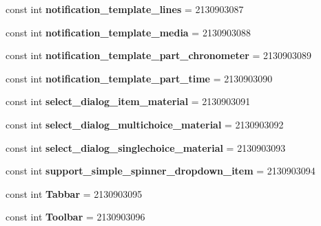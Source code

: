 \begin{DoxyCompactItemize}
\mbox{\label{class_pinned_app_1_1_droid_1_1_resource_1_1_layout_a040671cccbbccdfeee80094184351834}} 
const int {\bfseries notification\+\_\+template\+\_\+lines} = 2130903087
\item 
\mbox{\label{class_pinned_app_1_1_droid_1_1_resource_1_1_layout_a8b436230893d47e1fb318144da757f17}} 
const int {\bfseries notification\+\_\+template\+\_\+media} = 2130903088
\item 
\mbox{\label{class_pinned_app_1_1_droid_1_1_resource_1_1_layout_a2f745082d246ce1fb074aae3e9f6e550}} 
const int {\bfseries notification\+\_\+template\+\_\+part\+\_\+chronometer} = 2130903089
\item 
\mbox{\label{class_pinned_app_1_1_droid_1_1_resource_1_1_layout_a156f87b378955448589c448c780253e9}} 
const int {\bfseries notification\+\_\+template\+\_\+part\+\_\+time} = 2130903090
\item 
\mbox{\label{class_pinned_app_1_1_droid_1_1_resource_1_1_layout_a98bd2519ac05f2921a80c63f0d2502ff}} 
const int {\bfseries select\+\_\+dialog\+\_\+item\+\_\+material} = 2130903091
\item 
\mbox{\label{class_pinned_app_1_1_droid_1_1_resource_1_1_layout_aff0a7a56ac6020d3fa87f1478ec6ca05}} 
const int {\bfseries select\+\_\+dialog\+\_\+multichoice\+\_\+material} = 2130903092
\item 
\mbox{\label{class_pinned_app_1_1_droid_1_1_resource_1_1_layout_afe47de51e8b821e9d35d7d248da095de}} 
const int {\bfseries select\+\_\+dialog\+\_\+singlechoice\+\_\+material} = 2130903093
\item 
\mbox{\label{class_pinned_app_1_1_droid_1_1_resource_1_1_layout_a0f2bbc52b25aea6b47cda0ff4248f472}} 
const int {\bfseries support\+\_\+simple\+\_\+spinner\+\_\+dropdown\+\_\+item} = 2130903094
\item 
\mbox{\label{class_pinned_app_1_1_droid_1_1_resource_1_1_layout_ab2359dafe517c21035f87cc1a4aa64ea}} 
const int {\bfseries Tabbar} = 2130903095
\item 
\mbox{\label{class_pinned_app_1_1_droid_1_1_resource_1_1_layout_a0bc37a657e652a73c6e9c46879e0ee53}} 
const int {\bfseries Toolbar} = 2130903096
\end{DoxyCompactItemize}



